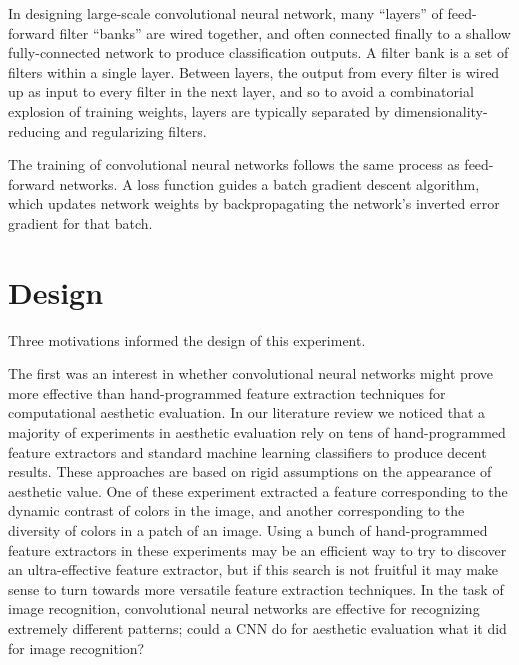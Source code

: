 \documentclass[midd]{thesis}
\begin{document}
In designing large-scale convolutional neural network, many ``layers'' of feed-forward filter ``banks'' are wired together, and often connected finally to a shallow fully-connected network to produce classification outputs. A filter bank is a set of filters within a single layer. Between layers, the output from every filter is wired up as input to every filter in the next layer, and so to avoid a combinatorial explosion of training weights, layers are typically separated by dimensionality-reducing and regularizing filters.

The training of convolutional neural networks follows the same process as feed-forward networks. A loss function guides a batch gradient descent algorithm, which updates network weights by backpropagating the network's inverted error gradient for that batch.























\chapter{Design}

Three motivations informed the design of this experiment.

The first was an interest in whether convolutional neural networks might prove more effective than hand-programmed feature extraction techniques for computational aesthetic evaluation. In our literature review we noticed that a majority of experiments in aesthetic evaluation rely on tens of hand-programmed feature extractors and standard machine learning classifiers to produce decent results. These approaches are based on rigid assumptions on the appearance of aesthetic value. One of these experiment extracted a feature corresponding to the dynamic contrast of colors in the image, and another corresponding to the diversity of colors in a patch of an image. Using a bunch of hand-programmed feature extractors in these experiments may be an efficient way to try to discover an ultra-effective feature extractor, but if this search is not fruitful it may make sense to turn towards more versatile feature extraction techniques. In the task of image recognition, convolutional neural networks are effective for recognizing extremely different patterns; could a CNN do for aesthetic evaluation what it did for image recognition?
\end{document}
